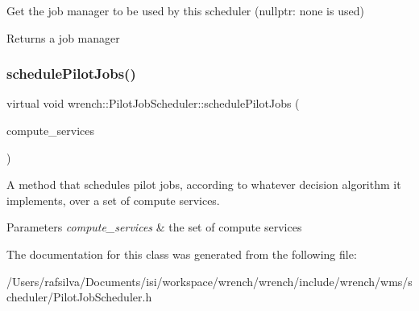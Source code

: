 Get the job manager to be used by this scheduler (nullptr\+: none is used) 

\begin{DoxyReturn}{Returns}
a job manager 
\end{DoxyReturn}
\mbox{\label{classwrench_1_1_pilot_job_scheduler_a903c44145dfce2964f90cc856146adbb}} 
\subsubsection{\texorpdfstring{schedule\+Pilot\+Jobs()}{schedulePilotJobs()}}
{\footnotesize\ttfamily virtual void wrench\+::\+Pilot\+Job\+Scheduler\+::schedule\+Pilot\+Jobs (\begin{DoxyParamCaption}\item[{const std\+::set$<$ \hyperlink{classwrench_1_1_compute_service}{Compute\+Service} $\ast$$>$ \&}]{compute\+\_\+services }\end{DoxyParamCaption})\hspace{0.3cm}{\ttfamily [pure virtual]}}



A method that schedules pilot jobs, according to whatever decision algorithm it implements, over a set of compute services. 


\begin{DoxyParams}{Parameters}
{\em compute\+\_\+services} & the set of compute services \\
\hline
\end{DoxyParams}


The documentation for this class was generated from the following file\+:\begin{DoxyCompactItemize}
\item 
/\+Users/rafsilva/\+Documents/isi/workspace/wrench/wrench/include/wrench/wms/scheduler/Pilot\+Job\+Scheduler.\+h\end{DoxyCompactItemize}
